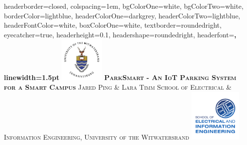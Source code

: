 \documentclass[landscape,a1paper,fontscale=0.45]{baposter} %
\begin{document}
\begin{poster}
{
headerborder=closed, %
colspacing=1em, %
bgColorOne=white, %
bgColorTwo=white, %
borderColor=lightblue, %
headerColorOne=darkgrey, %
headerColorTwo=lightblue, %
headerFontColor=white, %
boxColorOne=white, %
textborder=roundedright, %
eyecatcher=true, %
headerheight=0.1\textheight, %
headershape=roundedright, %
headerfont=\Large\bf\textsc, %
linewidth=1.5pt %
}
%
{\includegraphics[height = 6em]{wits-logo-1.jpg}} %
{\bf\textsc{ParkSmart - An IoT Parking System for a Smart Campus }\vspace{0.5em}} %
{\textsc{ Jared Ping \& Lara Timm  \hspace{5pt} \normalsize{School of Electrical \& Information Engineering, University of the Witwatersrand}}} %
{\includegraphics[height=7em]{eie-logo.pdf}} %



\end{poster}
\end{document}

